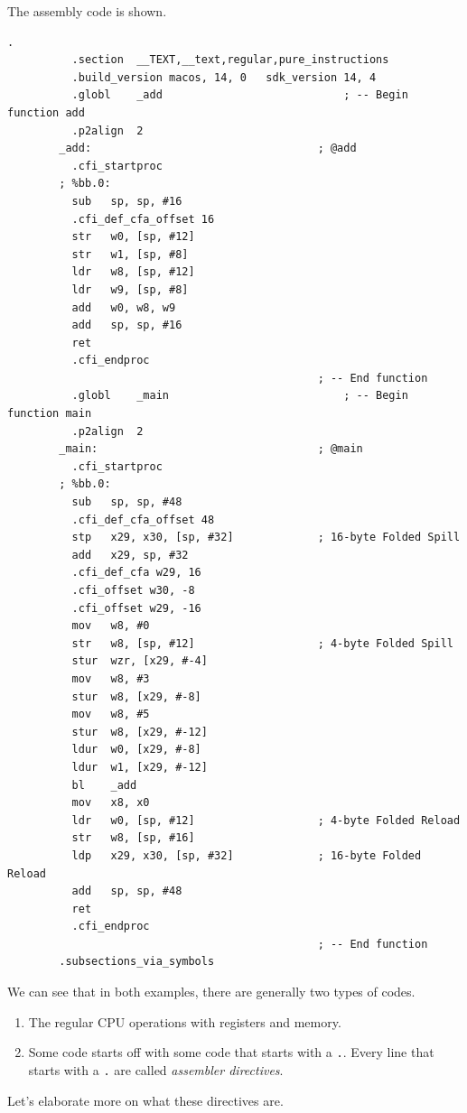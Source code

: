 \documentclass{article}
\begin{document}
    \begin{example}
      The assembly code is shown. 
      \begin{lstlisting}[language={[x86masm]Assembler}]
        .
          .section	__TEXT,__text,regular,pure_instructions
          .build_version macos, 14, 0	sdk_version 14, 4
          .globl	_add                            ; -- Begin function add
          .p2align	2
        _add:                                   ; @add
          .cfi_startproc
        ; %bb.0:
          sub	sp, sp, #16
          .cfi_def_cfa_offset 16
          str	w0, [sp, #12]
          str	w1, [sp, #8]
          ldr	w8, [sp, #12]
          ldr	w9, [sp, #8]
          add	w0, w8, w9
          add	sp, sp, #16
          ret
          .cfi_endproc
                                                ; -- End function
          .globl	_main                           ; -- Begin function main
          .p2align	2
        _main:                                  ; @main
          .cfi_startproc
        ; %bb.0:
          sub	sp, sp, #48
          .cfi_def_cfa_offset 48
          stp	x29, x30, [sp, #32]             ; 16-byte Folded Spill
          add	x29, sp, #32
          .cfi_def_cfa w29, 16
          .cfi_offset w30, -8
          .cfi_offset w29, -16
          mov	w8, #0
          str	w8, [sp, #12]                   ; 4-byte Folded Spill
          stur	wzr, [x29, #-4]
          mov	w8, #3
          stur	w8, [x29, #-8]
          mov	w8, #5
          stur	w8, [x29, #-12]
          ldur	w0, [x29, #-8]
          ldur	w1, [x29, #-12]
          bl	_add
          mov	x8, x0
          ldr	w0, [sp, #12]                   ; 4-byte Folded Reload
          str	w8, [sp, #16]
          ldp	x29, x30, [sp, #32]             ; 16-byte Folded Reload
          add	sp, sp, #48
          ret
          .cfi_endproc
                                                ; -- End function
        .subsections_via_symbols
      \end{lstlisting}
    \end{example}
      
    We can see that in both examples, there are generally two types of codes. 
    \begin{enumerate}
      \item The regular CPU operations with registers and memory. 
      \item Some code starts off with some code that starts with a \texttt{.}. Every line that starts with a \texttt{.} are called \textit{assembler directives}. 
    \end{enumerate}
    Let's elaborate more on what these directives are. 
\end{document}
